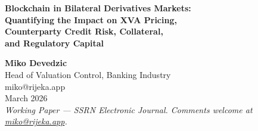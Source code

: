\documentclass[12pt,letterpaper]{article}
\numberwithin{equation}{section}
\theoremstyle{remark}
\begin{document}

\thispagestyle{empty}

\begin{center}

{\LARGE\bfseries\color{navyblue}
  Blockchain in Bilateral Derivatives Markets:\\[6pt]
  Quantifying the Impact on XVA Pricing,\\
  Counterparty Credit Risk, Collateral,\\
  and Regulatory Capital
}

\vspace{20pt}

{\large\textbf{Miko Devedzic}}\\[4pt]
{\normalsize\color{dimgray}Head of Valuation Control, Banking Industry}\\[2pt]
{\normalsize\color{accentblue}miko@rijeka.app}\\[16pt]
{\normalsize\color{dimgray}March 2026}\\[6pt]
{\small\itshape\color{dimgray}
  Working Paper --- SSRN Electronic Journal.
  Comments welcome at
  \href{mailto:miko@rijeka.app}{miko@rijeka.app}.
}

\end{center}

\vspace{12pt}
\end{document}
